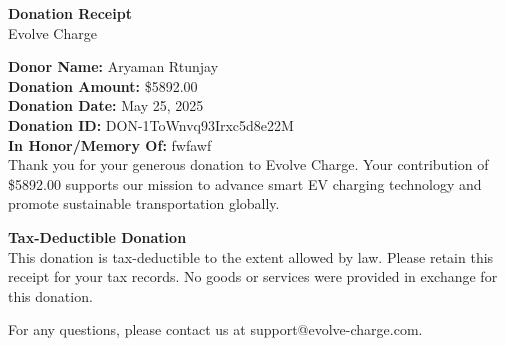 \documentclass[a4paper,12pt]{article}
\begin{document}
\begin{center}
{\Large \textbf{Donation Receipt}}\\
\vspace{0.5cm}
Evolve Charge
\end{center}

\vspace{0.5cm}

\noindent
{\bf Donor Name:} Aryaman Rtunjay\\
{\bf Donation Amount:} \$5892.00\\
{\bf Donation Date:} May 25, 2025\\
{\bf Donation ID:} DON-1ToWnvq93Irxc5d8e22M\\
\noindent
{\bf In Honor/Memory Of:} fwfawf\\

\vspace{0.5cm}
\noindent
Thank you for your generous donation to Evolve Charge. Your contribution of \$5892.00 supports our mission to advance smart EV charging technology and promote sustainable transportation globally.

\vspace{0.5cm}

\noindent
{\bf Tax-Deductible Donation}\\
This donation is tax-deductible to the extent allowed by law. Please retain this receipt for your tax records. No goods or services were provided in exchange for this donation.

\vspace{0.5cm}

\noindent
For any questions, please contact us at support@evolve-charge.com.
\end{document}
